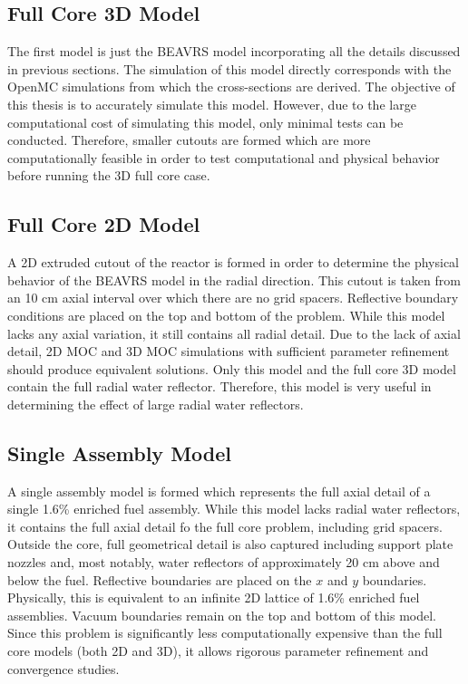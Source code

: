 \subsection{Full Core 3D Model}
\label{sec:beavrs-3D}

The first model is just the BEAVRS model incorporating all the details discussed in previous sections. The simulation of this model directly corresponds with the OpenMC simulations from which the cross-sections are derived. The objective of this thesis is to accurately simulate this model. However, due to the large computational cost of simulating this model, only minimal tests can be conducted. Therefore, smaller cutouts are formed which are more computationally feasible in order to test computational and physical behavior before running the 3D full core case.


\subsection{Full Core 2D Model}
\label{sec:beavrs-2D}

A 2D extruded cutout of the reactor is formed in order to determine the physical behavior of the BEAVRS model in the radial direction. This cutout is taken from an 10 cm axial interval over which there are no grid spacers. Reflective boundary conditions are placed on the top and bottom of the problem. While this model lacks any axial variation, it still contains all radial detail. Due to the lack of axial detail, 2D \ac{MOC} and 3D \ac{MOC} simulations with sufficient parameter refinement should produce equivalent solutions. Only this model and the full core 3D model contain the full radial water reflector. Therefore, this model is very useful in determining the effect of large radial water reflectors. 

\subsection{Single Assembly Model}
\label{sec:beavrs-single-assembly}

A single assembly model is formed which represents the full axial detail of a single 1.6\% enriched fuel assembly. While this model lacks radial water reflectors, it contains the full axial detail fo the full core problem, including grid spacers. Outside the core, full geometrical detail is also captured including support plate nozzles and, most notably, water reflectors of approximately 20 cm above and below the fuel. Reflective boundaries are placed on the $x$ and $y$ boundaries. Physically, this is equivalent to an infinite 2D lattice of 1.6\% enriched fuel assemblies. Vacuum boundaries remain on the top and bottom of this model. Since this problem is significantly less computationally expensive than the full core models (both 2D and 3D), it allows rigorous parameter refinement and convergence studies.

